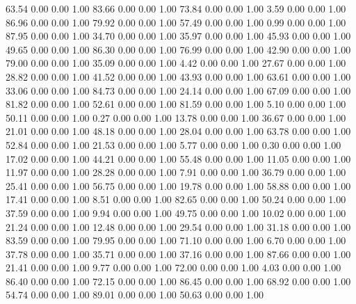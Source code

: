    63.54   0.00   0.00   1.00
   83.66   0.00   0.00   1.00
   73.84   0.00   0.00   1.00
    3.59   0.00   0.00   1.00
   86.96   0.00   0.00   1.00
   79.92   0.00   0.00   1.00
   57.49   0.00   0.00   1.00
    0.99   0.00   0.00   1.00
   87.95   0.00   0.00   1.00
   34.70   0.00   0.00   1.00
   35.97   0.00   0.00   1.00
   45.93   0.00   0.00   1.00
   49.65   0.00   0.00   1.00
   86.30   0.00   0.00   1.00
   76.99   0.00   0.00   1.00
   42.90   0.00   0.00   1.00
   79.00   0.00   0.00   1.00
   35.09   0.00   0.00   1.00
    4.42   0.00   0.00   1.00
   27.67   0.00   0.00   1.00
   28.82   0.00   0.00   1.00
   41.52   0.00   0.00   1.00
   43.93   0.00   0.00   1.00
   63.61   0.00   0.00   1.00
   33.06   0.00   0.00   1.00
   84.73   0.00   0.00   1.00
   24.14   0.00   0.00   1.00
   67.09   0.00   0.00   1.00
   81.82   0.00   0.00   1.00
   52.61   0.00   0.00   1.00
   81.59   0.00   0.00   1.00
    5.10   0.00   0.00   1.00
   50.11   0.00   0.00   1.00
    0.27   0.00   0.00   1.00
   13.78   0.00   0.00   1.00
   36.67   0.00   0.00   1.00
   21.01   0.00   0.00   1.00
   48.18   0.00   0.00   1.00
   28.04   0.00   0.00   1.00
   63.78   0.00   0.00   1.00
   52.84   0.00   0.00   1.00
   21.53   0.00   0.00   1.00
    5.77   0.00   0.00   1.00
    0.30   0.00   0.00   1.00
   17.02   0.00   0.00   1.00
   44.21   0.00   0.00   1.00
   55.48   0.00   0.00   1.00
   11.05   0.00   0.00   1.00
   11.97   0.00   0.00   1.00
   28.28   0.00   0.00   1.00
    7.91   0.00   0.00   1.00
   36.79   0.00   0.00   1.00
   25.41   0.00   0.00   1.00
   56.75   0.00   0.00   1.00
   19.78   0.00   0.00   1.00
   58.88   0.00   0.00   1.00
   17.41   0.00   0.00   1.00
    8.51   0.00   0.00   1.00
   82.65   0.00   0.00   1.00
   50.24   0.00   0.00   1.00
   37.59   0.00   0.00   1.00
    9.94   0.00   0.00   1.00
   49.75   0.00   0.00   1.00
   10.02   0.00   0.00   1.00
   21.24   0.00   0.00   1.00
   12.48   0.00   0.00   1.00
   29.54   0.00   0.00   1.00
   31.18   0.00   0.00   1.00
   83.59   0.00   0.00   1.00
   79.95   0.00   0.00   1.00
   71.10   0.00   0.00   1.00
    6.70   0.00   0.00   1.00
   37.78   0.00   0.00   1.00
   35.71   0.00   0.00   1.00
   37.16   0.00   0.00   1.00
   87.66   0.00   0.00   1.00
   21.41   0.00   0.00   1.00
    9.77   0.00   0.00   1.00
   72.00   0.00   0.00   1.00
    4.03   0.00   0.00   1.00
   86.40   0.00   0.00   1.00
   72.15   0.00   0.00   1.00
   86.45   0.00   0.00   1.00
   68.92   0.00   0.00   1.00
   54.74   0.00   0.00   1.00
   89.01   0.00   0.00   1.00
   50.63   0.00   0.00   1.00
